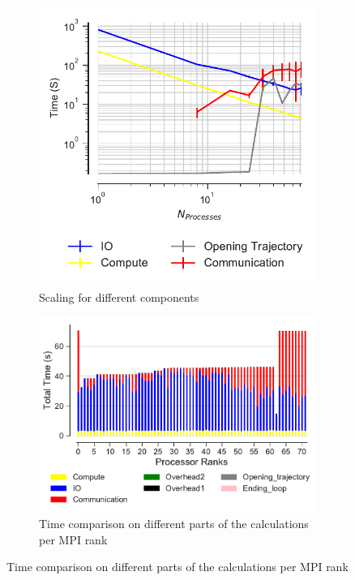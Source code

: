 \begin{figure}
\begin{subfigure}{.4\textwidth}
  \includegraphics[width=\linewidth]{figures/main-RMSD-time_comp_IO_comparison.pdf}
\caption{Scaling for different components}
\label{fig:ScalingComputeIO}
\end{subfigure}
\hfill
\begin{subfigure} {.5\textwidth}
  \includegraphics[width=\linewidth]{figures/main-RMSD-BarPlot-rank-comparison_72_4.pdf}
  \caption{Time comparison on different parts of the calculations per MPI rank}
  \label{fig:MPIranks}
\end{subfigure}


\end{figure}
